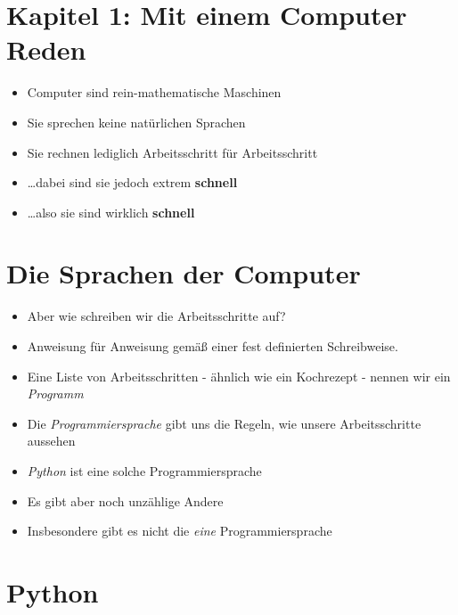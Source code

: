 \section{Kapitel 1: Mit einem Computer Reden}
\begin{frame}
    \slidehead
    \begin{itemize}[<+->]
        \item Computer sind rein-mathematische Maschinen
        \item Sie sprechen keine natürlichen Sprachen
        \item Sie rechnen lediglich Arbeitsschritt für Arbeitsschritt
        \item \dots dabei sind sie jedoch extrem \textbf{schnell}
        \vspace{3em}
        \item \dots also sie sind wirklich \textbf{\Huge schnell}
    \end{itemize}
\end{frame}

\section{Die Sprachen der Computer}
\begin{frame}
    \slidehead
    \begin{itemize}[<+->]
        \item Aber wie schreiben wir die Arbeitsschritte auf?
        \item Anweisung für Anweisung gemäß einer fest definierten Schreibweise.
        \item Eine Liste von Arbeitsschritten - ähnlich wie ein Kochrezept - nennen wir ein \emph{Programm}
        \item Die \emph{Programmiersprache} gibt uns die Regeln, wie unsere Arbeitsschritte aussehen
        \item \emph{Python} ist eine solche Programmiersprache
        \item Es gibt aber noch unzählige Andere
        \item Insbesondere gibt es nicht die \emph{eine} Programmiersprache
    \end{itemize}
\end{frame}

\section{Python}
